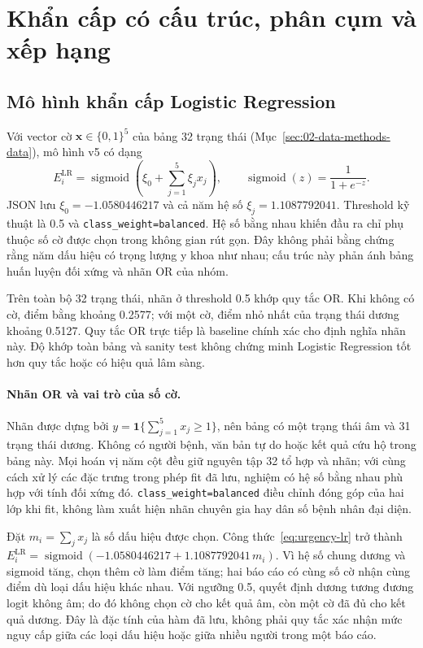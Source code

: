 \section{Khẩn cấp có cấu trúc, phân cụm và xếp hạng}\label{sec:02-data-methods-methods}
\subsection{Mô hình khẩn cấp Logistic Regression}\label{sec:02-urgency-lr}
Với vector cờ $\symbf{x}\in\{0,1\}^{5}$ của bảng 32 trạng thái (Mục~\ref{sec:02-data-methods-data}), mô hình v5 có dạng
\begin{equation}
 E_i^{\mathrm{LR}}=\operatorname{sigmoid}\!\left(\xi_0+\sum_{j=1}^{5}\xi_jx_j\right),
 \qquad \operatorname{sigmoid}(z)=\frac{1}{1+e^{-z}}.
 \label{eq:urgency-lr}
\end{equation}
JSON lưu $\xi_0=-1.0580446217$ và cả năm hệ số $\xi_j=1.1087792041$. Threshold kỹ thuật là 0.5 và \texttt{class\_weight=balanced}. Hệ số bằng nhau khiến đầu ra chỉ phụ thuộc số cờ được chọn trong không gian rút gọn. Đây không phải bằng chứng rằng năm dấu hiệu có trọng lượng y khoa như nhau; cấu trúc này phản ánh bảng huấn luyện đối xứng và nhãn OR của nhóm.

Trên toàn bộ 32 trạng thái, nhãn ở threshold 0.5 khớp quy tắc OR. Khi không có cờ, điểm bằng khoảng 0.2577; với một cờ, điểm nhỏ nhất của trạng thái dương khoảng 0.5127. Quy tắc OR trực tiếp là baseline chính xác cho định nghĩa nhãn này. Độ khớp toàn bảng và sanity test không chứng minh Logistic Regression tốt hơn quy tắc hoặc có hiệu quả lâm sàng.

\paragraph{Nhãn OR và vai trò của số cờ.} Nhãn được dựng bởi $y=\mathbf{1}\{\sum_{j=1}^{5}x_j\geq1\}$, nên bảng có một trạng thái âm và 31 trạng thái dương. Không có người bệnh, văn bản tự do hoặc kết quả cứu hộ trong bảng này. Mọi hoán vị năm cột đều giữ nguyên tập 32 tổ hợp và nhãn; với cùng cách xử lý các đặc trưng trong phép fit đã lưu, nghiệm có hệ số bằng nhau phù hợp với tính đối xứng đó. \texttt{class\_weight=balanced} điều chỉnh đóng góp của hai lớp khi fit, không làm xuất hiện nhãn chuyên gia hay dân số bệnh nhân đại diện.

Đặt $m_i=\sum_jx_j$ là số dấu hiệu được chọn. Công thức~\ref{eq:urgency-lr} trở thành $E_i^{\mathrm{LR}}=\operatorname{sigmoid}(-1.0580446217+1.1087792041\,m_i)$. Vì hệ số chung dương và sigmoid tăng, chọn thêm cờ làm điểm tăng; hai báo cáo có cùng số cờ nhận cùng điểm dù loại dấu hiệu khác nhau. Với ngưỡng 0.5, quyết định dương tương đương logit không âm; do đó không chọn cờ cho kết quả âm, còn một cờ đã đủ cho kết quả dương. Đây là đặc tính của hàm đã lưu, không phải quy tắc xác nhận mức nguy cấp giữa các loại dấu hiệu hoặc giữa nhiều người trong một báo cáo.

